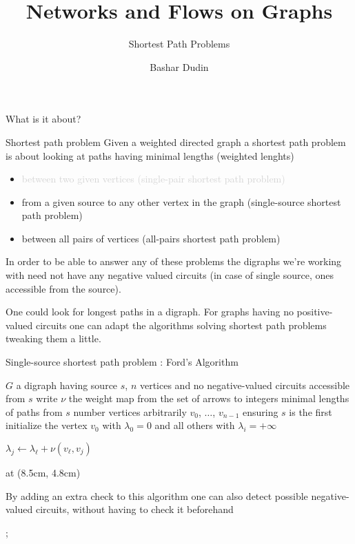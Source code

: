 \documentclass[32pt,aspectratio=169]{beamer}
\author[BD]{Bashar Dudin}
\institute[]{EPITA}
\title{Networks and Flows on Graphs} %
\subtitle{Shortest Path Problems}
\begin{document}
\begin{frame}[plain]
\titlepage %
\end{frame}

\begin{frame}{What is it about?}
  \begin{halfshyblock}{Shortest path problem}
    Given a weighted directed graph a shortest path problem is about
    looking at paths having minimal lengths (weighted lenghts)
    \begin{itemize}
    \item[\textcolor<2->{lightgray}{\textbullet}] \textcolor<2->{lightgray}{between two given vertices (single-pair shortest path problem)}
    \item from a given source to any other vertex in the graph (single-source shortest path problem)
    \item between all pairs of vertices (all-pairs shortest path problem)
    \end{itemize}
  \end{halfshyblock}
  \pause[3]In order to be able to answer any of these problems the digraphs
  we're working with need not have any negative valued
  circuits (in case of single source, ones accessible from the source).
  \pause[4]
  \begin{rem}
    One could look for longest paths in a digraph. For graphs having no
    positive-valued circuits one can adapt the algorithms solving
    shortest path problems tweaking them a little.
  \end{rem}
\end{frame}

\begin{frame}[t]{Single-source shortest path problem : Ford's Algorithm}
  \small{
    \begin{algorithmic}[1]
      \Require $G$ a digraph having source $s$, $n$
      vertices and no negative-valued circuits accessible from $s$
      \Statex write $\nu$ the weight map from the set of arrows to integers
      \Ensure minimal lengths of paths from $s$
      \State number vertices arbitrarily $v_0$, $\ldots$, $v_{n-1}$ ensuring $s$ is the first
      \State initialize the vertex $v_0$ with $\lambda_0 =0$ and all others with $\lambda_i = +\infty$

      \Statex
      \State $\lambda_j \gets \lambda_\ell + \nu(v_\ell, v_j)$
      \EndIf
      \EndFor
      \EndFor

    \end{algorithmic}
  }
  \tikzoverlay[text width=5.5cm] at (8.5cm, 4.8cm) {
    \begin{tcolorbox}[
      enhanced,
      parbox = false,
      colback=mLightBrown!10!white,
      colframe=mLightBrown,
      arc=0mm,
      ]
      \small{By adding an extra check to this algorithm one can also
        detect possible negative-valued circuits, without having to
        check it beforehand}
    \end{tcolorbox}%
  };
\end{frame}
\end{document}
